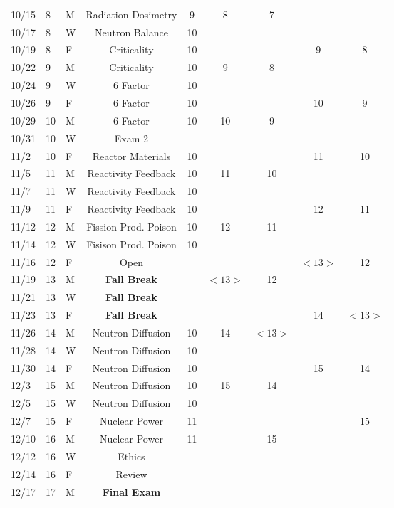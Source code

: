 \documentclass[11pt, a4paper]{article}
\begin{document}
\begin{table}[h]
\begin{center}
\begin{tabular}{lllcccccc}
10/15 & 8 & M & Radiation Dosimetry  & 9 &  8 & 7 &  &  \\
10/17 & 8 & W & Neutron Balance  & 10 &  &  &  &  \\
10/19 & 8 & F & Criticality  & 10 &  &  & 9 & 8 \\
10/22 & 9 & M & Criticality  & 10 & 9 & 8 &  &  \\
10/24 & 9 & W & 6 Factor  & 10 &  &  &  &  \\
10/26 & 9 & F & 6 Factor  & 10 &  &  & 10 & 9 \\
10/29 & 10 & M & 6 Factor  & 10 & 10 & 9 &  & \\
10/31 & 10 & W & Exam 2  &  &  &  &  &  \\
11/2 & 10 & F & Reactor Materials   &  10   &    &    &  11  & 10  \\
11/5 & 11 & M & Reactivity Feedback & 10  & 11 & 10 &  &  \\
11/7 & 11 & W & Reactivity Feedback  & 10 &  &  &  &  \\
11/9 & 11 & F & Reactivity Feedback  & 10 &  &  & 12 & 11 \\
11/12 & 12 & M & Fission Prod. Poison & 10 & 12 & 11 &  &  \\
11/14 & 12 & W & Fisison Prod. Poison  & 10 &  &  &  &  \\
11/16 & 12 & F & Open &  &  &  &  $<13>$ & 12 \\
11/19 & 13 & M & \textbf{Fall Break}& & $<13>$ & 12 &  &  \\
11/21 & 13 & W & \textbf{Fall Break}  &  &  &  &  &  \\
11/23 & 13 & F & \textbf{Fall Break}  &  &  &  & 14 & $<13>$ \\
11/26 & 14 & M & Neutron Diffusion& 10 &14& $<13>$ &  & \\
11/28 & 14 & W & Neutron Diffusion  & 10 &  &  &  &  \\
11/30 & 14 & F & Neutron Diffusion  & 10  &  &  & 15 & 14 \\
12/3 & 15 & M & Neutron Diffusion & 10 & 15 & 14 &  &  \\
12/5 & 15 & W & Neutron Diffusion  &  10 &  &  &  &  \\
12/7 & 15 & F & Nuclear Power & 11 &  &  &  & 15 \\
12/10 & 16 & M &  Nuclear Power& 11 &  & 15 &  &  \\
12/12 & 16 & W &  Ethics &  &  &  &  &  \\
12/14 & 16 & F & Review  &  &  &  &  &  \\
12/17 & 17 & M & \textbf{Final Exam} &   &  &  &  &  \\
\end{tabular}
\end{center}
\end{table}
\FloatBarrier



\end{document}
